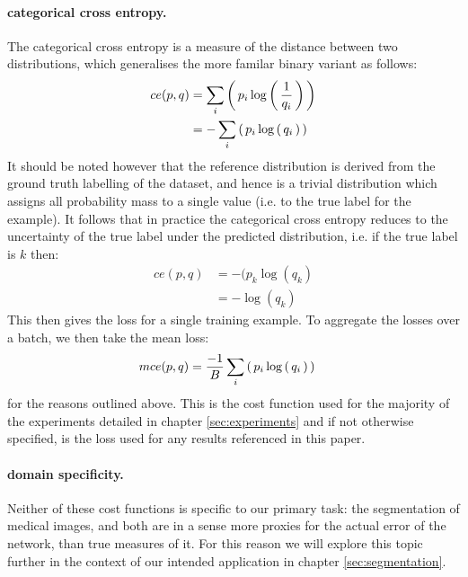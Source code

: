 \documentclass[msc]{infthesis}
\newcommand{\of}[1]{\left(\,{#1}\,\right)}
\begin{document}
\paragraph*{categorical cross entropy.}
\label{sec:classification:learning:cross-entropy}
%
The categorical cross entropy is a measure of the distance between two distributions, which generalises 
the more familar binary variant as follows:
%
\begin{align}
ce( p, q )
&=
\sum_i \of{ p_i \log\of{ 1 \over q_i } }
\\
&=
-\sum_i \of{ p_i \log\of{ q_i } }
\end{align}
%
It should be noted however that the reference distribution is derived from the ground truth labelling 
of the dataset, and hence is a trivial distribution which assigns all probability mass to a single value
(i.e. to the true label for the example).  It follows that in practice the categorical cross entropy 
reduces to the uncertainty of the true label under the predicted distribution, i.e. if the true label is 
\(k\) then:
%
\begin{align}
ce( p, q ) 
&= -( p_k \log( q_k ) \\ 
&= -\log( q_k )
\end{align}
%
This then gives the loss for a single training example.  To aggregate the losses over a batch, we then
take the mean loss:
\begin{align}
mce( p, q ) 
  &=
    {-1 \over B} \sum_i \of{ p_i \log\of{ q_i } }
\end{align}
for the reasons outlined above.  This is the cost function used for the majority of the experiments
detailed in chapter \ref{sec:experiments} and if not otherwise specified, is the loss used for any
results referenced in this paper.


\paragraph*{domain specificity.}
\label{sec:classification:2-3-3-1}
Neither of these cost functions is specific to our primary task: the segmentation of medical images,
and both are in a sense more proxies for the actual error of the network, than true measures of it.
For this reason we will explore this topic further in the context of our intended application in 
chapter \ref{sec:segmentation}.





\end{document}
